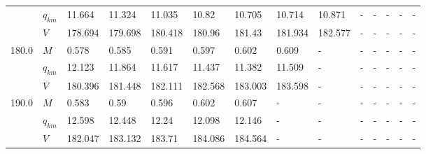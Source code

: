 \begin{tabular}{|l|l|llllllllllll|}
      & $q_{km}$ &   11.664 &   11.324 &   11.035 &                     10.82 &   10.705\cellcolor{green} &                    10.714 &                    10.871 &                         - &                         - &                         - &                         - &                         - \\
      & $V$ &  178.694 &  179.698 &  180.418 &                    180.96 &   181.43\cellcolor{green} &                   181.934 &                   182.577 &                         - &                         - &                         - &                         - &                         - \\
\hline
180.0 & $M$ &    0.578 &    0.585 &    0.591 &                     0.597 &    0.602\cellcolor{green} &                     0.609 &                         - &                         - &                         - &                         - &                         - &                         - \\
      & $q_{km}$ &   12.123 &   11.864 &   11.617 &                    11.437 &   11.382\cellcolor{green} &                    11.509 &                         - &                         - &                         - &                         - &                         - &                         - \\
      & $V$ &  180.396 &  181.448 &  182.111 &                   182.568 &  183.003\cellcolor{green} &                   183.598 &                         - &                         - &                         - &                         - &                         - &                         - \\
\hline
190.0 & $M$ &    0.583 &     0.59 &    0.596 &    0.602\cellcolor{green} &                     0.607 &                         - &                         - &                         - &                         - &                         - &                         - &                         - \\
      & $q_{km}$ &   12.598 &   12.448 &    12.24 &   12.098\cellcolor{green} &                    12.146 &                         - &                         - &                         - &                         - &                         - &                         - &                         - \\
      & $V$ &  182.047 &  183.132 &   183.71 &  184.086\cellcolor{green} &                   184.564 &                         - &                         - &                         - &                         - &                         - &                         - &                         - \\
\hline
\end{tabular}